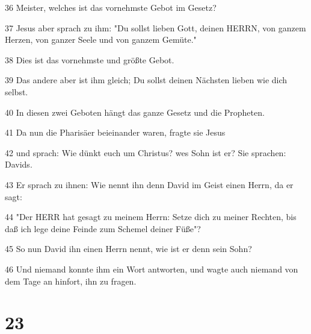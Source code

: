 \par 36 Meister, welches ist das vornehmste Gebot im Gesetz?
\par 37 Jesus aber sprach zu ihm: "Du sollst lieben Gott, deinen HERRN, von ganzem Herzen, von ganzer Seele und von ganzem Gemüte."
\par 38 Dies ist das vornehmste und größte Gebot.
\par 39 Das andere aber ist ihm gleich; Du sollst deinen Nächsten lieben wie dich selbst.
\par 40 In diesen zwei Geboten hängt das ganze Gesetz und die Propheten.
\par 41 Da nun die Pharisäer beieinander waren, fragte sie Jesus
\par 42 und sprach: Wie dünkt euch um Christus? wes Sohn ist er? Sie sprachen: Davids.
\par 43 Er sprach zu ihnen: Wie nennt ihn denn David im Geist einen Herrn, da er sagt:
\par 44 "Der HERR hat gesagt zu meinem Herrn: Setze dich zu meiner Rechten, bis daß ich lege deine Feinde zum Schemel deiner Füße"?
\par 45 So nun David ihn einen Herrn nennt, wie ist er denn sein Sohn?
\par 46 Und niemand konnte ihm ein Wort antworten, und wagte auch niemand von dem Tage an hinfort, ihn zu fragen.

\chapter{23}

